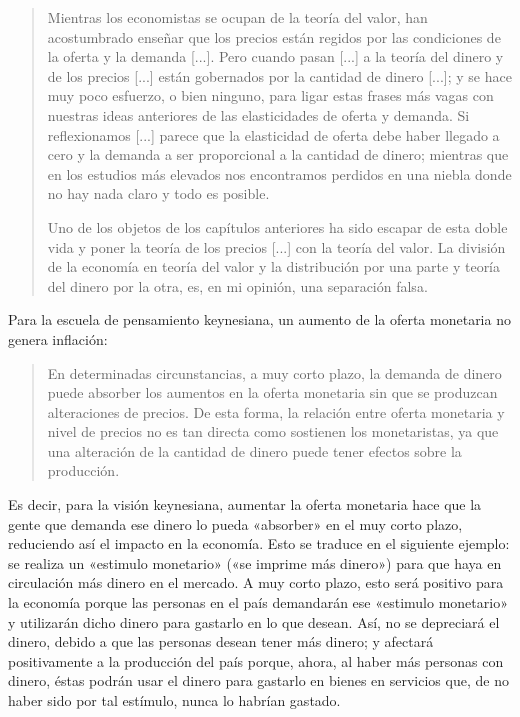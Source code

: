 \documentclass[12pt,a4paper,twoside]{book}
\begin{document}
\begin{quotation}
Mientras los economistas se ocupan de la teoría del valor, han acostumbrado enseñar que los precios están regidos por las condiciones de la oferta y la demanda [...]. Pero cuando pasan [...] a la teoría del dinero y de los precios [...] están gobernados por la cantidad de dinero [...]; y se hace muy poco esfuerzo, o bien ninguno, para ligar estas frases más vagas con nuestras ideas anteriores de las elasticidades de oferta y demanda. Si reflexionamos [...] parece que la elasticidad de oferta debe haber llegado a cero y la demanda a ser proporcional a la cantidad de dinero; mientras que en los estudios más elevados nos encontramos perdidos en una niebla donde no hay nada claro y todo es posible.

Uno de los objetos de los capítulos anteriores ha sido escapar de esta doble vida y poner la teoría de los precios [...] con la teoría del valor. La división de la economía en teoría del valor y la distribución por una parte y teoría del dinero por la otra, es, en mi opinión, una separación falsa. \cite[pág. 260]{keynes}
\end{quotation}

Para la escuela de pensamiento keynesiana, un aumento de la oferta monetaria no genera inflación:

\begin{quotation}
En determinadas circunstancias, a muy corto plazo, la demanda de dinero puede absorber los aumentos en la oferta monetaria sin que se produzcan alteraciones de precios. De esta forma, la relación entre oferta monetaria y nivel de precios no es tan directa como sostienen los monetaristas, ya que una alteración de la cantidad de dinero puede tener efectos sobre la producción. \cite[pág. 300]{mochobeker}
\end{quotation}

Es decir, para la visión keynesiana, aumentar la oferta monetaria hace que la gente que demanda ese dinero lo pueda «absorber» en el muy corto plazo, reduciendo así el impacto en la economía. Esto se traduce en el siguiente ejemplo: se realiza un «estimulo monetario» («se imprime más dinero») para que haya en circulación más dinero en el mercado. A muy corto plazo, esto será positivo para la economía porque las personas en el país demandarán ese «estimulo monetario» y utilizarán dicho dinero para gastarlo en lo que desean. Así, no se depreciará el dinero, debido a que las personas desean tener más dinero; y afectará positivamente a la producción del país porque, ahora, al haber más personas con dinero, éstas podrán usar el dinero para gastarlo en bienes en servicios que, de no haber sido por tal estímulo, nunca lo habrían gastado.
\end{document}
